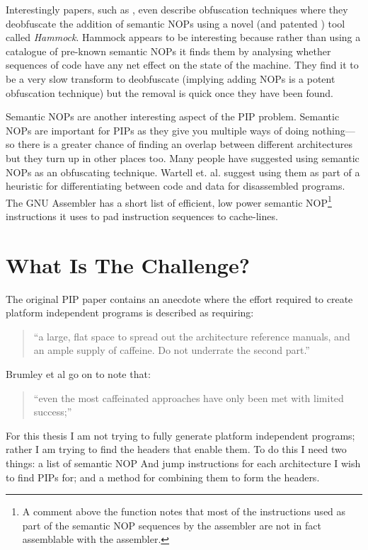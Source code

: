 \documentclass[10pt]{book}
\begin{document}
Interestingly papers, such as
\autocite{Christodorescu:2005vh}\autocite{Christodorescu:2005vf}, even
describe obfuscation techniques where they deobfuscate the addition of
semantic NOPs using a novel (and patented
\autocite{Christodorescu:2009wo}) tool called \emph{Hammock}. Hammock
appears to be interesting because rather than using a catalogue of
pre-known semantic NOPs it finds them by analysing whether sequences of
code have any net effect on the state of the machine. They find it to be
a very slow transform to deobfuscate (implying adding NOPs is a potent
obfuscation technique) but the removal is quick once they have been
found.

Semantic NOPs are another interesting aspect of the PIP problem.
Semantic NOPs are important for PIPs as they give you multiple ways of
doing nothing---so there is a greater chance of finding an overlap
between different architectures but they turn up in other places too.
Many people
\autocite{Christodorescu:2005vh}\autocite{Owens:2011um}\autocite{Bruschi:2007dn}
have suggested using semantic NOPs as an obfuscating technique. Wartell
et. al.\autocite{Wartell:2011ji} suggest using them as part of a
heuristic for differentiating between code and data for disassembled
programs. The GNU Assembler has a short list of efficient, low power
semantic NOP\footnote{A comment above the
  function\autocite{Anonymous:td} notes that most of the instructions
  used as part of the semantic NOP sequences by the assembler are not in
  fact assemblable with the assembler.} instructions it uses to pad
instruction sequences to cache-lines\autocite{Anonymous:td}.

\section{What Is The Challenge?}

The original PIP paper\autocite{Cha:2010uh} contains an anecdote where
the effort required to create platform independent programs is described
as requiring:

\begin{quote}
``a large, flat space to spread out the architecture reference manuals,
and an ample supply of caffeine. Do not underrate the second part.''

\end{quote}
Brumley et al go on to note that:

\begin{quote}
``even the most caffeinated approaches have only been met with limited
success;''

\end{quote}
For this thesis I am not trying to fully generate platform independent
programs; rather I am trying to find the headers that enable them. To do
this I need two things: a list of semantic NOP And jump instructions for
each architecture I wish to find PIPs for; and a method for combining
them to form the headers.
\end{document}
